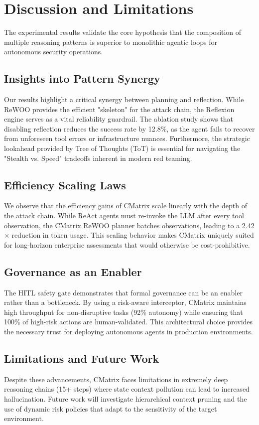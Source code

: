\section{Discussion and Limitations}

The experimental results validate the core hypothesis that the composition of multiple reasoning patterns is superior to monolithic agentic loops for autonomous security operations.

\subsection{Insights into Pattern Synergy}
Our results highlight a critical synergy between planning and reflection. While ReWOO provides the efficient "skeleton" for the attack chain, the Reflexion engine serves as a vital reliability guardrail. The ablation study shows that disabling reflection reduces the success rate by 12.8\%, as the agent fails to recover from unforeseen tool errors or infrastructure nuances. Furthermore, the strategic lookahead provided by Tree of Thoughts (ToT) is essential for navigating the "Stealth vs. Speed" tradeoffs inherent in modern red teaming.

\subsection{Efficiency Scaling Laws}
We observe that the efficiency gains of CMatrix scale linearly with the depth of the attack chain. While ReAct agents must re-invoke the LLM after every tool observation, the CMatrix ReWOO planner batches observations, leading to a 2.42$\times$ reduction in token usage. This scaling behavior makes CMatrix uniquely suited for long-horizon enterprise assessments that would otherwise be cost-prohibitive.

\subsection{Governance as an Enabler}
The HITL safety gate demonstrates that formal governance can be an enabler rather than a bottleneck. By using a risk-aware interceptor, CMatrix maintains high throughput for non-disruptive tasks (92\% autonomy) while ensuring that 100\% of high-risk actions are human-validated. This architectural choice provides the necessary trust for deploying autonomous agents in production environments.

\subsection{Limitations and Future Work}
Despite these advancements, CMatrix faces limitations in extremely deep reasoning chains (15+ steps) where state context pollution can lead to increased hallucination. Future work will investigate hierarchical context pruning and the use of dynamic risk policies that adapt to the sensitivity of the target environment.
